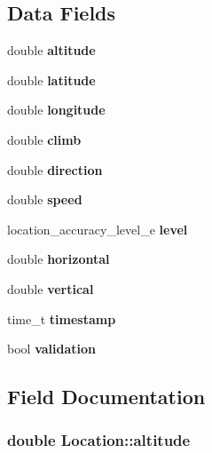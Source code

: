 \subsection*{Data Fields}
\begin{DoxyCompactItemize}
\item 
double {\bfseries altitude}\label{structLocation_a63e8622092a9e9e57b05feeb455156d1}

\item 
double {\bfseries latitude}\label{structLocation_aa7fa1116e7a00501032a724156ec946a}

\item 
double {\bfseries longitude}\label{structLocation_a1863cdc6296ff1cb37f4f4cf2d6ada6e}

\item 
double {\bfseries climb}\label{structLocation_a9695d14d0f84614176fbb5bb1a4fc330}

\item 
double {\bfseries direction}\label{structLocation_a37996bc58cf479c57bc69df9a321cdce}

\item 
double {\bfseries speed}\label{structLocation_afcb6178ec10e610e764eda6c9f214424}

\item 
location\-\_\-accuracy\-\_\-level\-\_\-e {\bfseries level}\label{structLocation_aad5c01cc48a4f114cfa58c6577a2c0b9}

\item 
double {\bfseries horizontal}\label{structLocation_aa825a3139b4af389fbbf046230e13513}

\item 
double {\bfseries vertical}\label{structLocation_abb6f6461f817837bf357cead739e45cc}

\item 
time\-\_\-t {\bfseries timestamp}\label{structLocation_a7ea7fb9fa3ec6fbcd2edc29d5e326726}

\item 
bool {\bfseries validation}\label{structLocation_a34f264a79e761f29c6d5c398bcaaa00e}

\end{DoxyCompactItemize}


\subsection{Field Documentation}
\subsubsection[{altitude}]{\setlength{\rightskip}{0pt plus 5cm}double Location\-::altitude}\label{structLocation_a63e8622092a9e9e57b05feeb455156d1}
